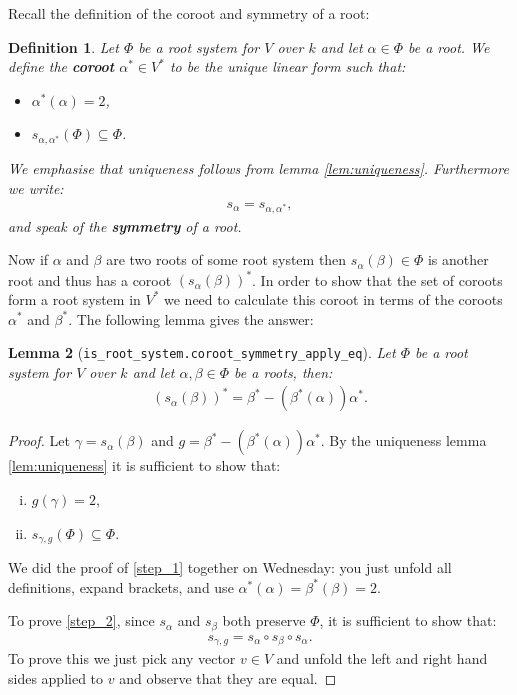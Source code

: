 \documentclass[12pt, a4paper]{article}
\newtheorem{lemma}{Lemma}[section]
\newtheorem{definition}[lemma]{Definition}
\begin{document}
Recall the definition of the coroot and symmetry of a root:
\begin{definition}
  Let $\Phi$ be a root system for $V$ over $k$ and let $\alpha \in \Phi$ be a root. We define the
  \textbf{coroot} $\alpha^* \in V^*$ to be the unique linear form such that:
  \begin{itemize}
    \item $\alpha^*(\alpha) = 2$,
    \item $s_{\alpha, \alpha^*}(\Phi) \subseteq \Phi$.
  \end{itemize}
  We emphasise that uniqueness follows from lemma \ref{lem:uniqueness}. Furthermore we write:
  \begin{align*}
    s_\alpha = s_{\alpha, \alpha^*},
  \end{align*}
  and speak of the \textbf{symmetry} of a root.
\end{definition}

Now if $\alpha$ and $\beta$ are two roots of some root system then $s_\alpha(\beta) \in \Phi$
is another root and thus has a coroot $(s_\alpha(\beta))^*$. In order to show that the set of
coroots form a root system in $V^*$ we need to calculate this coroot in terms of the coroots
$\alpha^*$ and $\beta^*$. The following lemma gives the answer:
\begin{lemma}[\texttt{is\_root\_system.coroot\_symmetry\_apply\_eq}]
  Let $\Phi$ be a root system for $V$ over $k$ and let $\alpha, \beta \in \Phi$ be a roots, then:
  \begin{align*}
    (s_\alpha(\beta))^* = \beta^* - (\beta^*(\alpha))\alpha^*.
  \end{align*}
\end{lemma}
\begin{proof}
  Let $\gamma = s_\alpha(\beta)$ and $g = \beta^* - (\beta^*(\alpha))\alpha^*$.
  By the uniqueness lemma \ref{lem:uniqueness} it is sufficient to show that:
  \begin{enumerate}[(i)]
    \item $g(\gamma) = 2$\label{step_1},
    \item $s_{\gamma, g}(\Phi) \subseteq \Phi$\label{step_2}.
  \end{enumerate}
  We did the proof of \eqref{step_1} together on Wednesday: you just unfold all definitions,
  expand brackets, and use $\alpha^*(\alpha) = \beta^*(\beta) = 2$.

  To prove \eqref{step_2}, since $s_\alpha$ and $s_\beta$ both preserve $\Phi$, it is sufficient to
  show that:
  \begin{align*}
    s_{\gamma, g} = s_\alpha \circ s_\beta \circ s_\alpha .
  \end{align*}
  To prove this we just pick any vector $v \in V$ and unfold the left and right hand sides applied
  to $v$ and observe that they are equal.
\end{proof}



\end{document}
